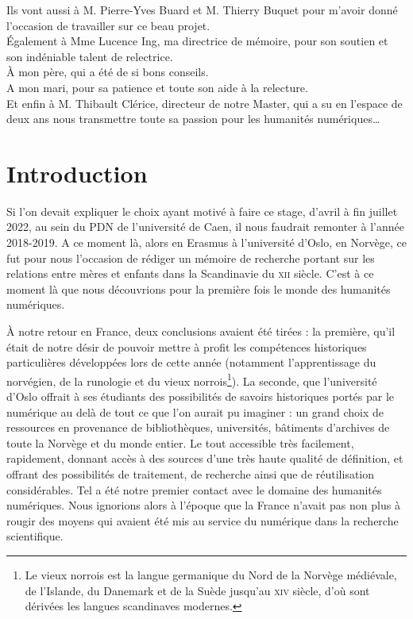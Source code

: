 \documentclass[a4paper,12pt,twoside]{book}
\begin{document}
	
	Ils vont aussi à M. Pierre-Yves Buard et M. Thierry Buquet pour m'avoir donné l'occasion de travailler sur ce beau projet.\\
	
	
	Également à Mme Lucence Ing, ma directrice de mémoire, pour son soutien et son indéniable talent de relectrice.\\
	
	
	À mon père, qui a été de si bons conseils.\\
	
	
	A mon mari, pour sa patience et toute son aide à la relecture.\\
	
	
	Et enfin à M. Thibault Clérice, directeur de notre Master, qui a su en l'espace de deux ans nous transmettre toute sa passion pour les humanités numériques\dots
	
	
	\printbibliography

	
	\chapter{Introduction}
Si l'on devait expliquer le choix ayant motivé à faire ce stage, d'avril à fin juillet 2022, au sein du \acrfull{PDN} de l'université de Caen, il nous faudrait remonter à l'année 2018-2019. A ce moment là, alors en Erasmus à l'université d'Oslo, en Norvège, ce fut pour nous l'occasion de rédiger un mémoire de recherche portant sur les relations entre mères et enfants dans la Scandinavie du \textsc{xii}\ieme{} siècle. C'est à ce moment là que nous découvrions pour la première fois le monde des humanités numériques.

À notre retour en France, deux conclusions avaient été tirées : la première, qu'il était de notre désir de pouvoir mettre à profit les compétences historiques particulières développées lors de cette année (notamment l'apprentissage du norvégien, de la runologie et du vieux norrois\footnote{Le vieux norrois est la langue germanique du Nord de la Norvège médiévale, de l'Islande, du Danemark et de la Suède jusqu'au \textsc{xiv}\ieme{} siècle, d'où sont dérivées les langues scandinaves modernes.}). La seconde, que l'université d'Oslo offrait à ses étudiants des possibilités de savoirs historiques portés par le numérique au delà de tout ce que l'on aurait pu imaginer : un grand choix de ressources en provenance de bibliothèques, universités, bâtiments d'archives de toute la Norvège et du monde entier. Le tout accessible très facilement, rapidement, donnant accès à des sources d'une très haute qualité de définition, et offrant des possibilités de traitement, de recherche ainsi que de réutilisation considérables. Tel a été notre premier contact avec le domaine des humanités numériques. Nous ignorions alors à l'époque que la France n'avait pas non plus à rougir des moyens qui avaient été mis au service du numérique dans la recherche scientifique.
\end{document}

